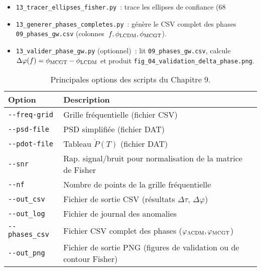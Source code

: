 \begin{itemize}
  \item \texttt{13\_tracer\_ellipses\_fisher.py} : trace les ellipses de confiance (68 %

  \item \texttt{13\_generer\_phases\_completes.py} : génère le CSV complet des phases \texttt{09\_phases\_gw.csv} (colonnes $f,\phi_{\rm LCDM},\phi_{\rm MCGT}$).

  \item \texttt{13\_valider\_phase\_gw.py} (optionnel) : lit \texttt{09\_phases\_gw.csv}, calcule $\Delta\varphi(f)=\phi_{\rm MCGT}-\phi_{\rm LCDM}$ et produit \texttt{fig\_04\_validation\_delta\_phase.png}.
\end{itemize}

\begin{table}[htbp]
  \centering
  \small
  \begin{tabular}{@{}ll@{}}
    \toprule
    Option               & Description                                                         \\
    \midrule
    \verb|--freq-grid|   & Grille fréquentielle (fichier CSV)                                  \\
    \verb|--psd-file|    & PSD simplifiée (fichier DAT)                                        \\
    \verb|--pdot-file|   & Tableau \(\dot P(T)\) (fichier DAT)                                 \\
    \verb|--snr|         & Rap. signal/bruit pour normalisation de la matrice de Fisher        \\
    \verb|--nf|          & Nombre de points de la grille fréquentielle                         \\
    \verb|--out_csv|     & Fichier de sortie CSV (résultats \(\Delta\tau,\,\Delta\varphi\))    \\
    \verb|--out_log|     & Fichier de journal des anomalies                                    \\
    \verb|--phases_csv|  & Fichier CSV complet des phases (\(\varphi_{\Lambda\rm CDM},\varphi_{\rm MCGT}\)) \\
    \verb|--out_png|     & Fichier de sortie PNG (figures de validation ou de contour Fisher)  \\
    \bottomrule
  \end{tabular}
  \caption{Principales options des scripts du Chapitre 9.}
  \label{tab:flags_chap9}
\end{table}

